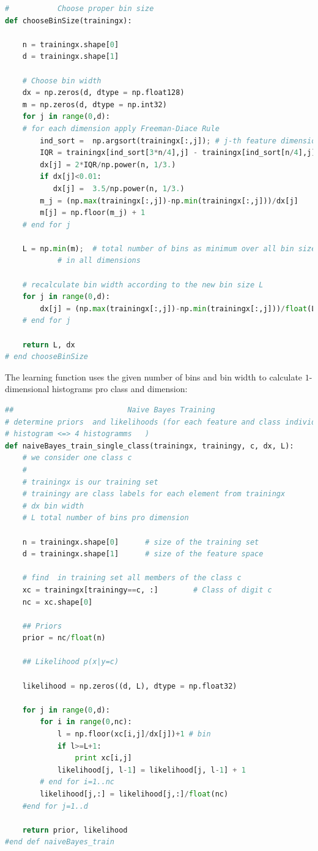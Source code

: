 \documentclass{article}
\begin{document}
\begin{lstlisting}[language=Python]
# 			Choose proper bin size
def chooseBinSize(trainingx):
  
    n = trainingx.shape[0]
    d = trainingx.shape[1]
    
    # Choose bin width 
    dx = np.zeros(d, dtype = np.float128)
    m = np.zeros(d, dtype = np.int32)
    for j in range(0,d):
	# for each dimension apply Freeman-Diace Rule
        ind_sort =  np.argsort(trainingx[:,j]); # j-th feature dimension
        IQR = trainingx[ind_sort[3*n/4],j] - trainingx[ind_sort[n/4],j]        
        dx[j] = 2*IQR/np.power(n, 1/3.)        
        if dx[j]<0.01:
           dx[j] =  3.5/np.power(n, 1/3.)        
        m_j = (np.max(trainingx[:,j])-np.min(trainingx[:,j]))/dx[j]   
        m[j] = np.floor(m_j) + 1       
    # end for j
        
    L = np.min(m);  # total number of bins as minimum over all bin sizes
		    # in all dimensions
    
    # recalculate bin width according to the new bin size L
    for j in range(0,d):
        dx[j] = (np.max(trainingx[:,j])-np.min(trainingx[:,j]))/float(L-1)
    # end for j 
    
    return L, dx
# end chooseBinSize
\end{lstlisting}

The learning function uses the given number of bins and bin width to calculate $1$-dimensional histograms pro class and dimension:

\begin{lstlisting}[language=Python]
##                          Naive Bayes Training
# determine priors  and likelihoods (for each feature and class individual 
# histogram <=> 4 histogramms   ) 
def naiveBayes_train_single_class(trainingx, trainingy, c, dx, L):
    # we consider one class c
    #    
    # trainingx is our training set    
    # trainingy are class labels for each element from trainingx
    # dx bin width
    # L total number of bins pro dimension
    
    n = trainingx.shape[0]      # size of the training set
    d = trainingx.shape[1]      # size of the feature space
    
    # find  in training set all members of the class c
    xc = trainingx[trainingy==c, :]        # Class of digit c
    nc = xc.shape[0]

    ## Priors
    prior = nc/float(n)
    
    ## Likelihood p(x|y=c)
    
    likelihood = np.zeros((d, L), dtype = np.float32)
  
    for j in range(0,d):
        for i in range(0,nc):    
            l = np.floor(xc[i,j]/dx[j])+1 # bin 
            if l>=L+1:
                print xc[i,j]
            likelihood[j, l-1] = likelihood[j, l-1] + 1
        # end for i=1..nc
        likelihood[j,:] = likelihood[j,:]/float(nc)    
    #end for j=1..d                 
    
    return prior, likelihood
#end def naiveBayes_train
\end{lstlisting}
\end{document}
